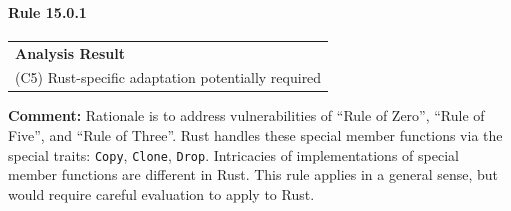 \paragraph{Rule 15.0.1}
\begin{longtable}{p{13cm}}
\textbf{Analysis Result} \\
(C5) Rust-specific adaptation potentially required \\
\end{longtable}
\textbf{Comment:} Rationale is to address vulnerabilities of ``Rule of Zero'', ``Rule of Five'', and  ``Rule of Three''. Rust handles these special member functions via the special traits: \texttt{Copy}, \texttt{Clone}, \texttt{Drop}. Intricacies of \Cpp implementations of special member functions are different in Rust. This rule applies in a general sense, but would require careful evaluation to apply to Rust. \\
